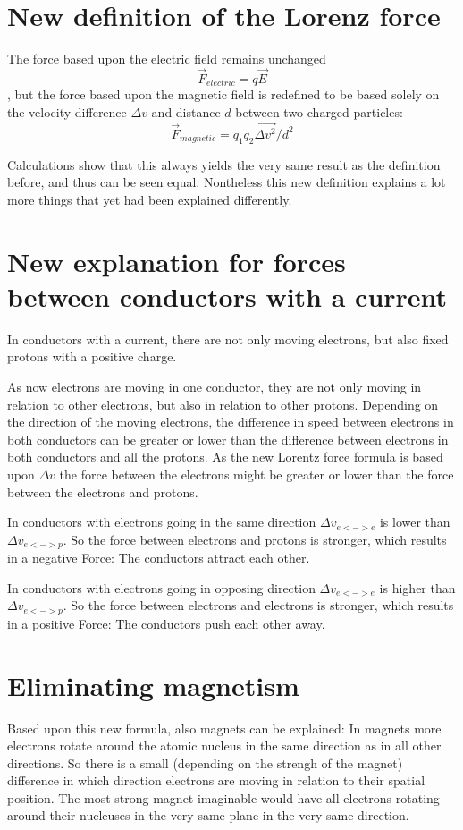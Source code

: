 \documentclass[12pt,a4paper,twocolumn]{article}
\begin{document}
\section{New definition of the Lorenz force}
The force based upon the electric field remains unchanged $$\vec{F}_{electric}=q\vec{E}$$, but the force based upon the magnetic field is redefined to be based solely on the velocity difference $\Delta v$ and distance $d$ between two charged particles: $$\vec{F}_{magnetic}=q_1 q_2 \vec{\Delta v^2} / d^2$$

Calculations show that this always yields the very same result as the definition before, and thus can be seen equal. Nontheless this new definition explains a lot more things that yet had been explained differently.

\section{New explanation for forces between conductors with a current}
In conductors with a current, there are not only moving electrons, but also fixed protons with a positive charge.

As now electrons are moving in one conductor, they are not only moving in relation to other electrons, but also in relation to other protons. Depending on the direction of the moving electrons, the difference in speed between electrons in both conductors can be greater or lower than the difference between electrons in both conductors and all the protons. As the new Lorentz force formula is based upon $\Delta v$ the force between the electrons might be greater or lower than the force between the electrons and protons.

In conductors with electrons going in the same direction $\Delta v_{e<->e}$ is lower than $\Delta v_{e<->p}$. So the force between electrons and protons is stronger, which results in a negative Force: The conductors attract each other.

In conductors with electrons going in opposing direction $\Delta v_{e<->e}$ is higher than $\Delta v_{e<->p}$. So the force between electrons and electrons is stronger, which results in a positive Force: The conductors push each other away.

\section{Eliminating magnetism}
Based upon this new formula, also magnets can be explained: In magnets more electrons rotate around the atomic nucleus in the same direction as in all other directions. So there is a small (depending on the strengh of the magnet) difference in which direction electrons are moving in relation to their spatial position. The most strong magnet imaginable would have all electrons rotating around their nucleuses in the very same plane in the very same direction.
\end{document}
